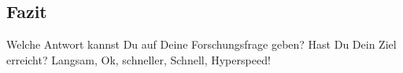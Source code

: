 \subsection{Fazit}
Welche Antwort kannst Du auf Deine Forschungsfrage geben? Hast Du Dein Ziel
erreicht?  Langsam, Ok, schneller, Schnell, Hyperspeed!

